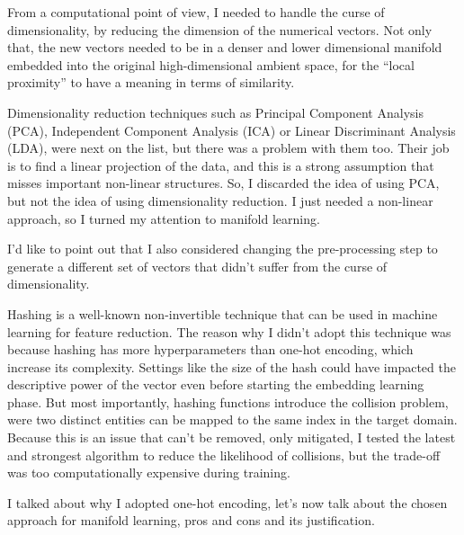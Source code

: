 From a computational point of view, I needed to handle the curse of dimensionality, by reducing the dimension of the numerical vectors.
Not only that, the new vectors needed to be in a denser and lower dimensional manifold embedded into the original high-dimensional ambient space,
for the ``local proximity'' to have a meaning in terms of similarity.

Dimensionality reduction techniques such as Principal Component Analysis (PCA),
Independent Component Analysis (ICA) or Linear Discriminant Analysis (LDA), were next on the list, but there was a problem with them too.
Their job is to find a linear projection of the data, and this is a strong assumption that misses important non-linear
structures. So, I discarded the idea of using PCA, but not the idea of using dimensionality reduction.
I just needed a non-linear approach, so I turned my attention to manifold learning.

I'd like to point out that I also considered changing the pre-processing step to generate a different
set of vectors that didn't suffer from the curse of dimensionality.

Hashing is a well-known non-invertible technique that can be used in machine learning for feature reduction.
The reason why I didn't adopt this technique was because hashing has more hyperparameters than one-hot encoding, which increase its complexity.
Settings like the size of the hash could have impacted the descriptive power of the vector even before starting the embedding learning phase.
But most importantly, hashing functions introduce the collision problem, were two distinct entities can be mapped to the same index in the target domain.
Because this is an issue that can't be removed, only mitigated, I tested the latest and strongest algorithm to reduce the likelihood of collisions,
but the trade-off was too computationally expensive during training.

I talked about why I adopted one-hot encoding, let's now talk about the chosen approach for manifold learning, pros and cons and its justification.
